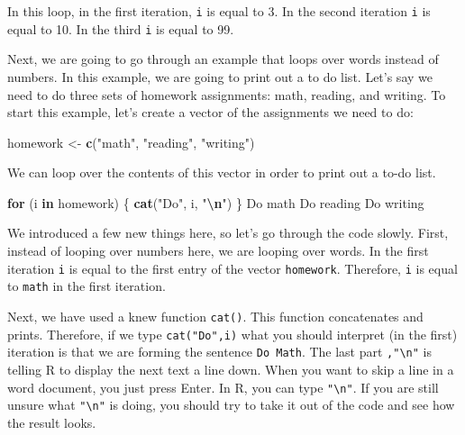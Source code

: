 \documentclass[
]{book}
\newenvironment{Shaded}{\begin{snugshade}}{\end{snugshade}}
\newcommand{\ControlFlowTok}[1]{\textcolor[rgb]{0.13,0.29,0.53}{\textbf{#1}}}
\newcommand{\FunctionTok}[1]{\textcolor[rgb]{0.13,0.29,0.53}{\textbf{#1}}}
\newcommand{\NormalTok}[1]{#1}
\newcommand{\OtherTok}[1]{\textcolor[rgb]{0.56,0.35,0.01}{#1}}
\newcommand{\SpecialCharTok}[1]{\textcolor[rgb]{0.81,0.36,0.00}{\textbf{#1}}}
\newcommand{\StringTok}[1]{\textcolor[rgb]{0.31,0.60,0.02}{#1}}
\begin{document}
In this loop, in the first iteration, \texttt{i} is equal to 3. In the second iteration \texttt{i} is equal to 10. In the third \texttt{i} is equal to 99.

Next, we are going to go through an example that loops over words instead of numbers. In this example, we are going to print out a to do list. Let's say we need to do three sets of homework assignments: math, reading, and writing. To start this example, let's create a vector of the assignments we need to do:

\begin{Shaded}
\begin{Highlighting}[]
\NormalTok{homework }\OtherTok{\textless{}{-}} \FunctionTok{c}\NormalTok{(}\StringTok{"math"}\NormalTok{, }\StringTok{"reading"}\NormalTok{, }\StringTok{"writing"}\NormalTok{)}
\end{Highlighting}
\end{Shaded}

We can loop over the contents of this vector in order to print out a to-do list.

\begin{Shaded}
\begin{Highlighting}[]
\ControlFlowTok{for}\NormalTok{ (i }\ControlFlowTok{in}\NormalTok{ homework) \{}
  \FunctionTok{cat}\NormalTok{(}\StringTok{"Do"}\NormalTok{, i, }\StringTok{"}\SpecialCharTok{\textbackslash{}n}\StringTok{"}\NormalTok{)}
\NormalTok{\}}
\NormalTok{Do math }
\NormalTok{Do reading }
\NormalTok{Do writing }
\end{Highlighting}
\end{Shaded}

We introduced a few new things here, so let's go through the code slowly. First, instead of looping over numbers here, we are looping over words. In the first iteration \texttt{i} is equal to the first entry of the vector \texttt{homework}. Therefore, \texttt{i} is equal to \texttt{math} in the first iteration.

Next, we have used a knew function \texttt{cat()}. This function concatenates and prints. Therefore, if we type \texttt{cat("Do",i)} what you should interpret (in the first) iteration is that we are forming the sentence \texttt{Do\ Math}. The last part \texttt{,"\textbackslash{}n"} is telling R to display the next text a line down. When you want to skip a line in a word document, you just press Enter. In R, you can type \texttt{"\textbackslash{}n"}. If you are still unsure what \texttt{"\textbackslash{}n"} is doing, you should try to take it out of the code and see how the result looks.
\end{document}
